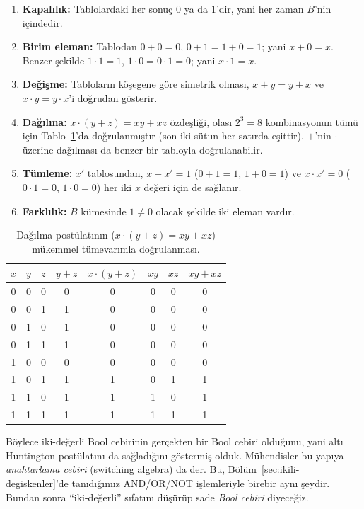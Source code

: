 \begin{enumerate}[nosep, leftmargin=*]
    \item \textbf{Kapalılık:} Tablolardaki her sonuç $0$ ya da $1$'dir, yani her zaman
    $B$'nin içindedir.
    \item \textbf{Birim eleman:} Tablodan $0+0=0$, $0+1=1+0=1$; yani $x+0=x$. Benzer
    şekilde $1\cdot 1=1$, $1\cdot 0=0\cdot 1=0$; yani $x\cdot 1=x$.
    \item \textbf{Değişme:} Tabloların köşegene göre simetrik olması, $x+y=y+x$ ve
    $x\cdot y=y\cdot x$'i doğrudan gösterir.
    \item \textbf{Dağılma:} $x\cdot(y+z)=xy+xz$ özdeşliği, olası $2^3=8$ kombinasyonun
    tümü için Tablo~\ref{tab:dagilma-dogrulama}'da doğrulanmıştır (son iki sütun her satırda
    eşittir). $+$'nin $\cdot$ üzerine dağılması da benzer bir tabloyla doğrulanabilir.
    \item \textbf{Tümleme:} $x'$ tablosundan, $x+x'=1$ ($0+1=1$, $1+0=1$) ve $x\cdot x'=0$
    ($0\cdot 1=0$, $1\cdot 0=0$) her iki $x$ değeri için de sağlanır.
    \item \textbf{Farklılık:} $B$ kümesinde $1\neq 0$ olacak şekilde iki eleman vardır.
\end{enumerate}

\begin{table}[h]
\centering
\begin{tabular}{ccc|c|c|c|c|c}
\toprule
$x$ & $y$ & $z$ & $y+z$ & $x\cdot(y+z)$ & $xy$ & $xz$ & $xy+xz$ \\
\midrule
0&0&0&0&0&0&0&0\\
0&0&1&1&0&0&0&0\\
0&1&0&1&0&0&0&0\\
0&1&1&1&0&0&0&0\\
1&0&0&0&0&0&0&0\\
1&0&1&1&1&0&1&1\\
1&1&0&1&1&1&0&1\\
1&1&1&1&1&1&1&1\\
\bottomrule
\end{tabular}
\caption{Dağılma postülatının ($x\cdot(y+z)=xy+xz$) mükemmel tümevarımla doğrulanması.}
\label{tab:dagilma-dogrulama}
\end{table}

Böylece iki-değerli Bool cebirinin gerçekten bir Bool cebiri olduğunu, yani altı Huntington
postülatını da sağladığını göstermiş olduk. Mühendisler bu yapıya \emph{anahtarlama cebiri}
(switching algebra) da der. Bu, Bölüm~\ref{sec:ikili-degiskenler}'de tanıdığımız AND/OR/NOT
işlemleriyle birebir aynı şeydir. Bundan sonra ``iki-değerli'' sıfatını düşürüp sade
\emph{Bool cebiri} diyeceğiz.

